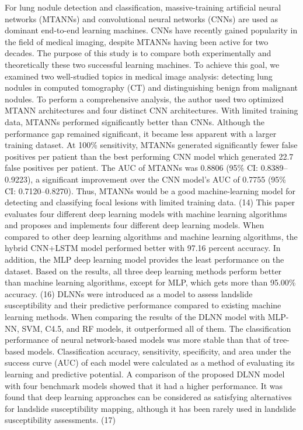 \documentclass[conference]{IEEEtran}
\begin{document}
For lung nodule detection and classification, massive-training artificial neural networks (MTANNs) and convolutional neural networks (CNNs) are used as dominant end-to-end learning machines. CNNs have recently gained popularity in the field of medical imaging, despite MTANNs having been active for two decades. The purpose of this study is to compare both experimentally and theoretically these two successful learning machines. To achieve this goal, we examined two well-studied topics in medical image analysis: detecting lung nodules in computed tomography (CT) and distinguishing benign from malignant nodules. To perform a comprehensive analysis, the author used two optimized MTANN architectures and four distinct CNN architectures. With limited training data, MTANNs performed significantly better than CNNs. Although the performance gap remained significant, it became less apparent with a larger training dataset. At 100\% sensitivity, MTANNs generated significantly fewer false positives per patient than the best performing CNN model which generated 22.7 false positives per patient. The AUC of MTANNs was 0.8806 (95\% CI: 0.8389–0.9223), a significant improvement over the CNN model's AUC of 0.7755 (95\% CI: 0.7120–0.8270). Thus, MTANNs would be a good machine-learning model for detecting and classifying focal lesions with limited training data. (14) This paper evaluates four different deep learning models with machine learning algorithms and proposes and implements four different deep learning models. When compared to other deep learning algorithms and machine learning algorithms, the hybrid CNN+LSTM model performed better with 97.16 percent accuracy. In addition, the MLP deep learning model provides the least performance on the dataset. Based on the results, all three deep learning methods perform better than machine learning algorithms, except for MLP, which gets more than 95.00\% accuracy. (16) DLNNs were introduced as a model to assess landslide susceptibility and their predictive performance compared to existing machine learning methods. When comparing the results of the DLNN model with MLP-NN, SVM, C4.5, and RF models, it outperformed all of them. The classification performance of neural network-based models was more stable than that of tree-based models. Classification accuracy, sensitivity, specificity, and area under the success curve (AUC) of each model were calculated as a method of evaluating its learning and predictive potential. A comparison of the proposed DLNN model with four benchmark models showed that it had a higher performance. It was found that deep learning approaches can be considered as satisfying alternatives for landslide susceptibility mapping, although it has been rarely used in landslide susceptibility assessments. (17) 
\end{document}
